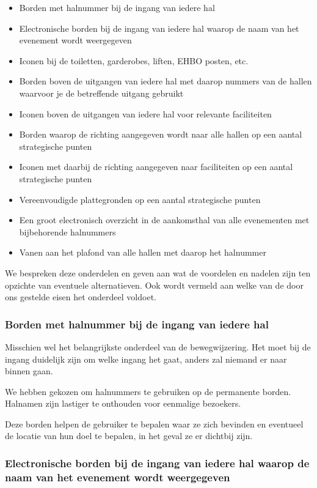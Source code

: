 \begin{itemize}
\item Borden met halnummer bij de ingang van iedere hal
\item Electronische borden bij de ingang van iedere hal waarop de naam van het evenement wordt weergegeven
\item Iconen bij de toiletten, garderobes, liften, EHBO posten, etc.
\item Borden boven de uitgangen van iedere hal met daarop nummers van de hallen waarvoor je de betreffende uitgang gebruikt
\item Iconen boven de uitgangen van iedere hal voor relevante faciliteiten
\item Borden waarop de richting aangegeven wordt naar alle hallen op een aantal strategische punten
\item Iconen met daarbij de richting aangegeven naar faciliteiten op een aantal strategische punten
\item Vereenvoudigde plattegronden op een aantal strategische punten
\item Een groot electronisch overzicht in de aankomsthal van alle evenementen met bijbehorende halnummers
\item Vanen aan het plafond van alle hallen met daarop het halnummer
\end{itemize}

We bespreken deze onderdelen en geven aan wat de voordelen en nadelen zijn ten opzichte van eventuele alternatieven. Ook wordt vermeld aan welke van de door ons gestelde eisen het onderdeel voldoet.


\subsubsection{Borden met halnummer bij de ingang van iedere hal}

Misschien wel het belangrijkste onderdeel van de bewegwijzering. Het moet bij de ingang duidelijk zijn om welke ingang het gaat, anders zal niemand er naar binnen gaan.

We hebben gekozen om halnummers te gebruiken op de permanente borden. Halnamen zijn lastiger te onthouden voor eenmalige bezoekers.

Deze borden helpen de gebruiker te bepalen waar ze zich bevinden en eventueel de locatie van hun doel te bepalen, in het geval ze er dichtbij zijn.


\subsubsection{Electronische borden bij de ingang van iedere hal waarop de naam van het evenement wordt weergegeven}


